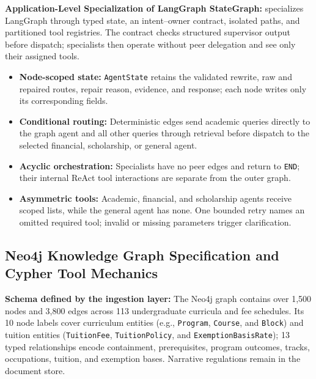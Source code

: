 \textbf{Application-Level Specialization of LangGraph StateGraph:}
\system{} specializes LangGraph through typed state, an intent--owner contract, isolated paths, and partitioned tool registries. The contract checks structured supervisor output before dispatch; specialists then operate without peer delegation and see only their assigned tools.
\begin{itemize}
    \setlength{\itemsep}{1.5pt}
    \setlength{\parsep}{0pt}
    \setlength{\parskip}{0pt}
    \item \textbf{Node-scoped state:} \texttt{AgentState} retains the validated rewrite, raw and repaired routes, repair reason, evidence, and response; each node writes only its corresponding fields.

    \item \textbf{Conditional routing:} Deterministic edges send academic queries directly to the graph agent and all other queries through retrieval before dispatch to the selected financial, scholarship, or general agent.

    \item \textbf{Acyclic orchestration:} Specialists have no peer edges and return to \texttt{END}; their internal ReAct tool interactions are separate from the outer graph.

    \item \textbf{Asymmetric tools:} Academic, financial, and scholarship agents receive scoped lists, while the general agent has none. One bounded retry names an omitted required tool; invalid or missing parameters trigger clarification.
\end{itemize}

\subsection{Neo4j Knowledge Graph Specification and Cypher Tool Mechanics}
\label{sec:neo4j_graph}

\textbf{Schema defined by the ingestion layer:}
The Neo4j graph contains over 1,500 nodes and 3,800 edges across 113 undergraduate curricula and fee schedules. Its 10 node labels cover curriculum entities (e.g., \texttt{Program}, \texttt{Course}, and \texttt{Block}) and tuition entities (\texttt{TuitionFee}, \texttt{TuitionPolicy}, and \texttt{ExemptionBasisRate}); 13 typed relationships encode containment, prerequisites, program outcomes, tracks, occupations, tuition, and exemption bases. Narrative regulations remain in the document store.

